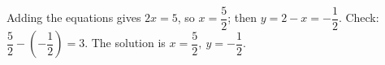 Adding the equations gives $2x=5$, so $x=\dfrac{5}{2}$; then $y=2-x=-\dfrac{1}{2}$. Check: $\dfrac{5}{2}-\left(-\dfrac{1}{2}\right)=3$. The solution is $\boxed{x=\dfrac{5}{2},\ y=-\dfrac{1}{2}}$.
